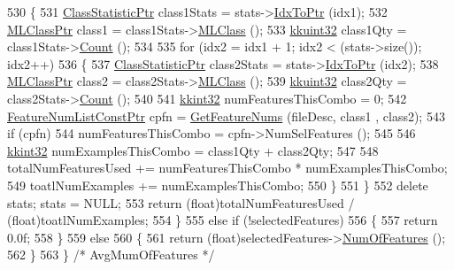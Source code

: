 \begin{DoxyCode}
530     \{
531       \hyperlink{class_k_k_m_l_l_1_1_class_statistic}{ClassStatisticPtr}  class1Stats = stats->\hyperlink{class_k_k_b_1_1_k_k_queue_acce2bdd8b3327e38266cf198382cd852}{IdxToPtr} (idx1);
532       \hyperlink{class_k_k_m_l_l_1_1_m_l_class}{MLClassPtr}  class1    = class1Stats->\hyperlink{class_k_k_m_l_l_1_1_class_statistic_a7f2775bca7634dd376ffe3c804e65c3e}{MLClass} ();
533       \hyperlink{namespace_k_k_b_af8d832f05c54994a1cce25bd5743e19a}{kkuint32}    class1Qty = class1Stats->\hyperlink{class_k_k_m_l_l_1_1_class_statistic_ace228f15b538c012781b4f6800c837c5}{Count} ();
534 
535       \textcolor{keywordflow}{for}  (idx2 = idx1 + 1;  idx2 < (stats->size());  idx2++)
536       \{
537         \hyperlink{class_k_k_m_l_l_1_1_class_statistic}{ClassStatisticPtr}  class2Stats = stats->\hyperlink{class_k_k_b_1_1_k_k_queue_acce2bdd8b3327e38266cf198382cd852}{IdxToPtr} (idx2);
538         \hyperlink{class_k_k_m_l_l_1_1_m_l_class}{MLClassPtr}  class2    = class2Stats->\hyperlink{class_k_k_m_l_l_1_1_class_statistic_a7f2775bca7634dd376ffe3c804e65c3e}{MLClass} ();
539         \hyperlink{namespace_k_k_b_af8d832f05c54994a1cce25bd5743e19a}{kkuint32}    class2Qty = class2Stats->\hyperlink{class_k_k_m_l_l_1_1_class_statistic_ace228f15b538c012781b4f6800c837c5}{Count} ();
540 
541         \hyperlink{namespace_k_k_b_a8fa4952cc84fda1de4bec1fbdd8d5b1b}{kkint32}  numFeaturesThisCombo = 0;
542         \hyperlink{namespace_k_k_m_l_l_a81284b0a14973267260023f9a72da94a}{FeatureNumListConstPtr}  cpfn = \hyperlink{class_k_k_m_l_l_1_1_s_v_mparam_ab44a92bf720b8a8fea7e52f8fb7f122a}{GetFeatureNums} (fileDesc, class1
      , class2);
543         \textcolor{keywordflow}{if}  (cpfn)
544           numFeaturesThisCombo = cpfn->NumSelFeatures ();
545 
546         \hyperlink{namespace_k_k_b_a8fa4952cc84fda1de4bec1fbdd8d5b1b}{kkint32}  numExamplesThisCombo = class1Qty + class2Qty;
547 
548         totalNumFeaturesUsed += numFeaturesThisCombo * numExamplesThisCombo;
549         toatlNumExamples     += numExamplesThisCombo;
550       \}
551     \}
552     \textcolor{keyword}{delete}  stats;  stats = NULL;
553     \textcolor{keywordflow}{return}  (\textcolor{keywordtype}{float})totalNumFeaturesUsed / (float)toatlNumExamples;
554   \}
555   \textcolor{keywordflow}{else} \textcolor{keywordflow}{if}  (!selectedFeatures)
556   \{
557     \textcolor{keywordflow}{return} 0.0f;
558   \}
559   \textcolor{keywordflow}{else}
560   \{
561     \textcolor{keywordflow}{return}  (\textcolor{keywordtype}{float})selectedFeatures->\hyperlink{class_k_k_m_l_l_1_1_feature_num_list_af2d974ca245a5d3c2bc88da0fe674493}{NumOfFeatures} ();
562   \}
563 \}  \textcolor{comment}{/* AvgMumOfFeatures */}
\end{DoxyCode}
